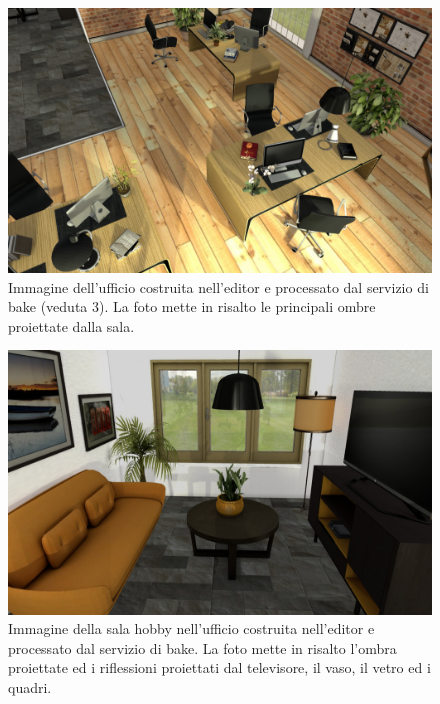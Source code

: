 \begin{figure}[htb]
 \centering
 \includegraphics[width=1\linewidth]{images/chapter_prove_sperimentali/scena_office_vista3.png}\hfill
 \caption[Ambiente virtuale: Ufficio, veduta 3]{Immagine dell'ufficio costruita nell'editor e processato dal servizio di bake (veduta 3). La foto mette in risalto le principali ombre proiettate dalla sala.}
 \label{fig:prove_sperimentali_qualita_visiva_ufficio_3}
\end{figure}
\begin{figure}[htb]
 \centering
 \includegraphics[width=1\linewidth]{images/chapter_prove_sperimentali/scena_office_hobby.png}\hfill
 \caption[Ambiente virtuale: Ufficio sala hobby]{Immagine della sala hobby nell'ufficio costruita nell'editor e processato dal servizio di bake. La foto mette in risalto l'ombra proiettate ed i riflessioni proiettati dal televisore, il vaso, il vetro ed i quadri.}
 \label{fig:prove_sperimentali_qualita_visiva_ufficio_hobby}
\end{figure}
